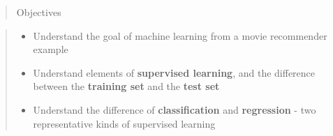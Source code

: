 \documentclass[]{article}
\providecommand{\tightlist}{%
  \setlength{\itemsep}{0pt}\setlength{\parskip}{0pt}}
\begin{document}
\begin{quote}
Objectives
\end{quote}

\begin{quote}
\begin{itemize}
\tightlist
\item
  Understand the goal of machine learning from a movie recommender
  example
\item
  Understand elements of \textbf{supervised learning}, and the
  difference between the \textbf{training set} and the \textbf{test set}
\item
  Understand the difference of \textbf{classification} and
  \textbf{regression} - two representative kinds of supervised learning
\end{itemize}
\end{quote}
\end{document}
